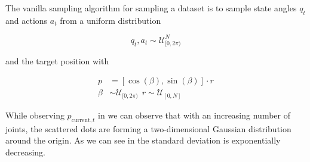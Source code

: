The vanilla sampling algorithm for sampling a dataset is to sample state angles $q_t$ and actions $a_t$ from a uniform distribution

\begin{equation} \label{eqn:angle_sample}
    q_t, a_t \sim \mathcal{U}_{[0, 2\pi)}^N
\end{equation}

and the target position with

\begin{align}
    p &= [\cos(\beta), \sin(\beta)] \cdot r \label{eqn:position_sample}\\
    \beta &\sim \mathcal{U}_{[0, 2\pi)} \ \ r \sim \mathcal{U}_{[0, N]} \nonumber
\end{align}

While observing $p_{\text{current}, t}$ in  we can observe that with an increasing number of joints, the scattered dots are forming a two-dimensional Gaussian distribution around the origin. As we can see in  the standard deviation is exponentially decreasing. 
